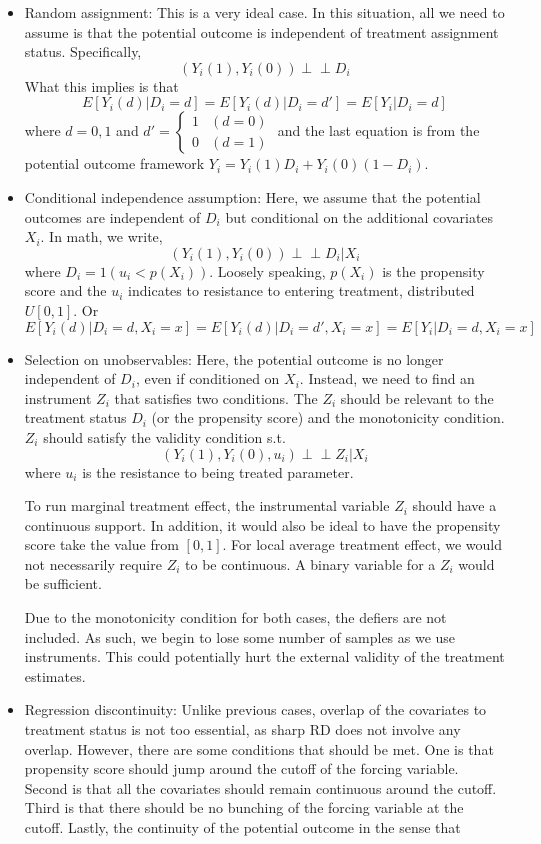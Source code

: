 \documentclass[12pt]{article}
\theoremstyle{definition}
\theoremstyle{property}
\theoremstyle{assumption}
\theoremstyle{example}
\theoremstyle{comment}
\begin{document}
\begin{itemize}
\begin{itemize}
\item Random assignment: This is a very ideal case. In this situation, all we need to assume is that the potential outcome is independent of treatment assignment status. Specifically, 
\[
(Y_i(1), Y_i(0)) \perp\!\!\!\perp D_i
\]
What this implies is that
\[
E[Y_i(d)|D_i=d]=E[Y_i(d)|D_i=d']=E[Y_i|D_i=d]
\]
where $d=0,1$ and $d'=\begin{cases} 1&(d=0)\\ 0 & (d=1)\end{cases}$ and the last equation is from the potential outcome framework $Y_i=Y_i(1)D_i+Y_i(0)(1-D_i)$.
\item Conditional independence assumption: Here, we assume that the potential outcomes are independent of $D_i$ but conditional on the additional covariates $X_i$. In math, we write, 
\[
(Y_i(1), Y_i(0)) \perp\!\!\!\perp D_i|X_i
\]
where $D_i=1(u_i<p(X_i))$. Loosely speaking, $p(X_i)$ is the propensity score and the $u_i$ indicates to resistance to entering treatment, distributed $U[0,1]$. Or
\[
E[Y_i(d)|D_i=d, X_i=x]=E[Y_i(d)|D_i=d', X_i=x]=E[Y_i|D_i=d, X_i=x]
\]
\item Selection on unobservables: Here, the potential outcome is no longer independent of $D_i$, even if conditioned on $X_i$. Instead, we need to find an instrument $Z_i$ that satisfies two conditions. The $Z_i$ should be relevant to the treatment status $D_i$  (or the propensity score) and the monotonicity condition. $Z_i$ should satisfy the validity condition s.t.
\[
(Y_i(1), Y_i(0), u_i) \perp\!\!\! \perp Z_i|X_i
\]
where $u_i$ is the resistance to being treated parameter. \par
To run marginal treatment effect, the instrumental variable $Z_i$ should have a continuous support. In addition, it would also be ideal to have the propensity score take the value from $[0,1]$. For local average treatment effect,  we would not necessarily require $Z_i$ to be continuous. A binary variable for a $Z_i$ would be sufficient. \par
Due to the monotonicity condition for both cases, the defiers are not included. As such, we begin to lose some number of samples as we use instruments. This could potentially hurt the external validity of the treatment estimates. 
\item Regression discontinuity: Unlike previous cases, overlap of the covariates to treatment status is not too essential, as sharp RD does not involve any overlap. However, there are some conditions that should be met. One is that propensity score should jump around the cutoff of the forcing variable. Second is that all the covariates should remain continuous around the cutoff. Third is that there should be no bunching of the forcing variable at the cutoff. Lastly, the continuity of the potential outcome in the sense that 

\end{itemize}
\end{itemize}
\end{document}

